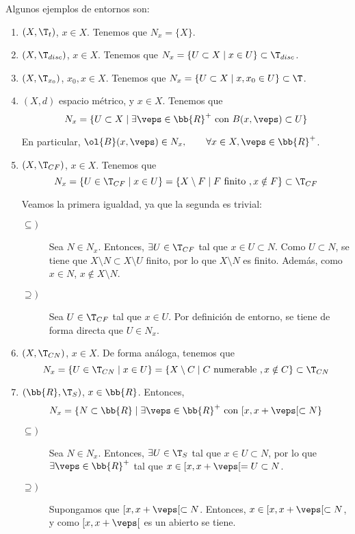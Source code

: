 \begin{ejemplo} Algunos ejemplos de entornos son:
    \begin{enumerate}
        \item $(X,\T_t)$, $x\in X$. Tenemos que $N_x=\{X\}$.
        \item $(X,\T_{disc})$, $x\in X$. Tenemos que $N_x=\{U\subset X\mid x\in U\}\subset \T_{disc}$.
        \item $(X,\T_{x_0})$, $x_0, x\in X$. Tenemos que $N_x=\{U\subset X\mid x,x_0\in U\}\subset \T$.
        \item $(X,d)$ espacio métrico, y $x\in X$. Tenemos que $$N_x=\{U\subset X\mid \exists \veps\in \bb{R}^+ \text{ con } B(x,\veps)\subset U\}$$

        En particular, $\ol{B}(x,\veps)\in N_x, \qquad \forall x\in X, \veps\in \bb{R}^+$.

        \item $(X,\T_{CF})$, $x\in X$. Tenemos que $$N_x= \{U\in \T_{CF}\mid x\in U\}=\{X\setminus F\mid F\text{ finito }, x\notin F\} \subset \T_{CF}$$

        Veamos la primera igualdad, ya que la segunda es trivial:
        \begin{description}
            \item [$\subseteq)$] Sea $N\in N_x$. Entonces, $\exists U\in \T_{CF}$ tal que $x\in U\subset N$. Como $U\subset N$, se tiene que $X\setminus N \subset X\setminus U$ finito, por lo que $X\setminus N$ es finito. Además, como $x\in N$, $x\notin X\setminus N$.

            \item [$\supseteq)$] Sea $U\in \T_{CF}$ tal que $x\in U$. Por definición de entorno, se tiene de forma directa que $U\in N_x$.
        \end{description}

        \item $(X,\T_{CN})$, $x\in X$. De forma análoga, tenemos que $$N_x= \{U\in \T_{CN}\mid x\in U\}=\{X\setminus C\mid C\text{ numerable }, x\notin C\} \subset \T_{CN}$$

        \item $(\bb{R}, \T_S)$, $x\in \bb{R}$. Entonces, 
        $$N_x=\{N\subset \bb{R}\mid \exists \veps\in \bb{R}^+ \text{ con } [x,x+\veps[\subset N\}$$
        \begin{description}
            \item [$\subseteq)$] Sea $N\in N_x$. Entonces, $\exists U\in \T_S$ tal que $x\in U\subset N$, por lo que $\exists \veps\in \bb{R}^+$ tal que $x\in [x,x+\veps[= U\subset N$.

            \item [$\supseteq)$] Supongamos que $[x,x+\veps[\subset N$. Entonces, $x\in [x,x+\veps[\subset N$, y como $[x,x+\veps[$ es un abierto se tiene.
        \end{description}
    \end{enumerate}
\end{ejemplo}

